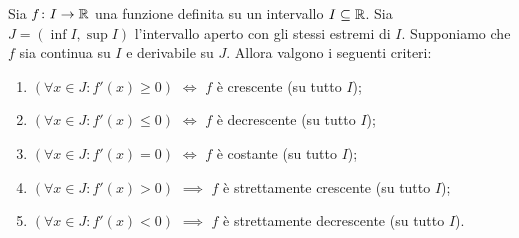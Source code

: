\begin{theorem}%
\label{th:criteri_monotonia}
\mymark{***}%
%
%
Sia $f\colon I \to {\mathbb R}$ una funzione definita su un intervallo $I\subseteq {\mathbb R}$. Sia $J= (\inf I, \sup I)$ l'intervallo aperto con gli stessi estremi di $I$.
Supponiamo che $f$ sia continua su $I$ e derivabile su $J$. 
Allora valgono i seguenti criteri:
\begin{enumerate}
\item
$(\forall x \in J\colon f'(x)\ge 0)$
$\iff$
$f$ è crescente (su tutto $I$);
\item
$(\forall x \in J\colon f'(x)\le 0)$
$\iff$
$f$ è decrescente (su tutto $I$);
\item
$(\forall x \in J\colon f'(x)=0)$
$\iff$
$f$ è costante (su tutto $I$);
\item
$(\forall x \in J\colon f'(x)>0)$
$\implies$
$f$ è strettamente crescente (su tutto $I$);
\item
$(\forall x \in J\colon f'(x)<0)$
$\implies$
$f$ è strettamente decrescente (su tutto $I$).
\end{enumerate}
\end{theorem}
%

